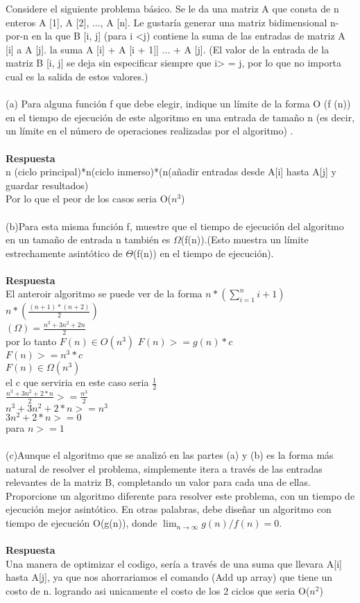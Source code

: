 \documentclass[a4paper,12pt]{article}
\begin{document}
Considere el siguiente problema básico. Se le da una matriz A que consta de n enteros A [1], A [2], ..., A [n]. Le gustaría generar una matriz bidimensional n-por-n en la que B [i, j] (para i <j) contiene la suma de las entradas de matriz A [i] a A [j]. la suma A [i] + A [i + 1]] ... + A [j]. (El valor de la entrada de la matriz B [i, j] se deja sin especificar siempre que i> = j, por lo que no importa cual es la salida de estos valores.)\\\\
(a) Para alguna función f que debe elegir, indique un límite de la forma O (f (n)) en el tiempo de ejecución de este algoritmo en una entrada de tamaño n (es decir, un límite en el número de operaciones realizadas por el algoritmo) .\\\\
\textbf{Respuesta}\\

n (ciclo principal)*n(ciclo inmerso)*(n(añadir entradas desde A[i] hasta A[j] y guardar resultados)\\
Por lo que el peor de los casos seria O($n^3$)\\\\
(b)Para esta misma función f, muestre que el tiempo de ejecución del algoritmo en un tamaño de entrada n también es $\Omega$(f(n)).(Esto muestra un límite estrechamente asintótico de $\Theta$(f(n)) en el tiempo de ejecución).\\\\
\textbf{Respuesta}\\
El anteroir algoritmo se puede ver de la forma $n*(\sum_{i=1}^{n}i+1)$\\
$n*(\frac{(n+1)*(n+2)}{2})$\\
$(\Omega)= \frac{n^3+3n^2+2n}{2}$\\
por lo tanto $F(n) \in O(n^3)$
$F(n) >= g(n)*c$\\
$F(n) >= n^3*c$\\
$F(n) \in \Omega(n^3)$\\
el c que serviria en este caso seria $\frac{1}{2}$\\
$\frac{n^3+3n^2+2*n}{2}>=\frac{n^3}{2}$\\
$n^3+3n^2+2*n>=n^3$\\
$3n^2+2*n>=0$\\
para $n>=1$\\\\
(c)Aunque el algoritmo que se analizó en las partes (a) y (b) es la forma más natural de resolver el problema, simplemente itera a través de las entradas relevantes de la matriz B, completando un valor para cada una de ellas. Proporcione un algoritmo diferente para resolver este problema, con un tiempo de ejecución mejor asintótico. En otras palabras, debe diseñar un algoritmo con tiempo de ejecución O(g(n)), donde $\lim_{n \to \infty}g(n)/f(n)=0.$\\\\
\textbf{Respuesta}\\
Una manera de optimizar el codigo, sería a través de una suma que llevara A[i] hasta A[j], ya que nos ahorrariamos el comando (Add up array) que tiene un costo de n. logrando asi unicamente el costo de los 2 ciclos que seria O($n^2$)\\

\cite{pdiniz}\\
\end{document}
